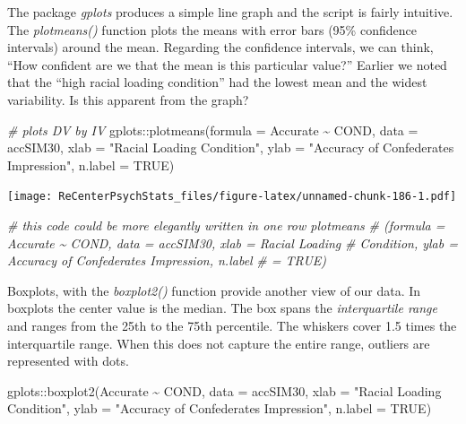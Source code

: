 \documentclass[
  11pt,
]{book}
\newenvironment{Shaded}{\begin{snugshade}}{\end{snugshade}}
\newcommand{\AttributeTok}[1]{\textcolor[rgb]{0.77,0.63,0.00}{#1}}
\newcommand{\CommentTok}[1]{\textcolor[rgb]{0.56,0.35,0.01}{\textit{#1}}}
\newcommand{\ConstantTok}[1]{\textcolor[rgb]{0.00,0.00,0.00}{#1}}
\newcommand{\FunctionTok}[1]{\textcolor[rgb]{0.00,0.00,0.00}{#1}}
\newcommand{\NormalTok}[1]{#1}
\newcommand{\SpecialCharTok}[1]{\textcolor[rgb]{0.00,0.00,0.00}{#1}}
\newcommand{\StringTok}[1]{\textcolor[rgb]{0.31,0.60,0.02}{#1}}
\begin{document}
The package \emph{gplots} produces a simple line graph and the script is fairly intuitive. The \emph{plotmeans()} function plots the means with error bars (95\% confidence intervals) around the mean. Regarding the confidence intervals, we can think, ``How confident are we that the mean is this particular value?'' Earlier we noted that the ``high racial loading condition'' had the lowest mean and the widest variability. Is this apparent from the graph?

\begin{Shaded}
\begin{Highlighting}[]
\CommentTok{\# plots DV by IV}
\NormalTok{gplots}\SpecialCharTok{::}\FunctionTok{plotmeans}\NormalTok{(}\AttributeTok{formula =}\NormalTok{ Accurate }\SpecialCharTok{\textasciitilde{}}\NormalTok{ COND, }\AttributeTok{data =}\NormalTok{ accSIM30, }\AttributeTok{xlab =} \StringTok{"Racial Loading Condition"}\NormalTok{,}
    \AttributeTok{ylab =} \StringTok{"Accuracy of Confederate\textquotesingle{}s Impression"}\NormalTok{, }\AttributeTok{n.label =} \ConstantTok{TRUE}\NormalTok{)}
\end{Highlighting}
\end{Shaded}

\texttt{[image: ReCenterPsychStats\_files/figure-latex/unnamed-chunk-186-1.pdf]}

\begin{Shaded}
\begin{Highlighting}[]
\CommentTok{\# this code could be more elegantly written in one row plotmeans}
\CommentTok{\# (formula = Accurate \textasciitilde{} COND, data = accSIM30, xlab = \textquotesingle{}Racial Loading}
\CommentTok{\# Condition\textquotesingle{}, ylab = \textquotesingle{}Accuracy of Confederate\textquotesingle{}s Impression\textquotesingle{}, n.label}
\CommentTok{\# = TRUE)}
\end{Highlighting}
\end{Shaded}

Boxplots, with the \emph{boxplot2()} function provide another view of our data. In boxplots the center value is the median. The box spans the \emph{interquartile range} and ranges from the 25th to the 75th percentile. The whiskers cover 1.5 times the interquartile range. When this does not capture the entire range, outliers are represented with dots.

\begin{Shaded}
\begin{Highlighting}[]
\NormalTok{gplots}\SpecialCharTok{::}\FunctionTok{boxplot2}\NormalTok{(Accurate }\SpecialCharTok{\textasciitilde{}}\NormalTok{ COND, }\AttributeTok{data =}\NormalTok{ accSIM30, }\AttributeTok{xlab =} \StringTok{"Racial Loading Condition"}\NormalTok{,}
    \AttributeTok{ylab =} \StringTok{"Accuracy of Confederate\textquotesingle{}s Impression"}\NormalTok{, }\AttributeTok{n.label =} \ConstantTok{TRUE}\NormalTok{)}
\end{Highlighting}
\end{Shaded}
\end{document}
